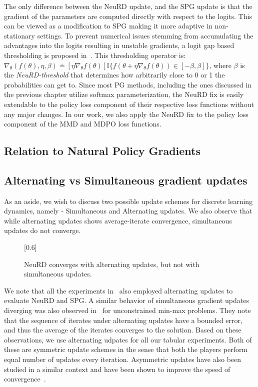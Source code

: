 The only difference between the NeuRD update, and the SPG update is that the gradient of the
parameters are computed directly with respect to the logits.
This can be viewed as a modification to SPG making it more adaptive in non-stationary settings.
To prevent numerical issues stemming from accumulating the advantages into the logits resulting in
unstable gradients, a logit gap based thresholding is proposed in~\cite{hennesNeural2020}.
This thresholding operator is: $\nabla_{\theta}(f(\theta), \eta, \beta) \doteq [\eta\nabla_\theta
		f(\theta)] \mathds{I}\{f(\theta + \eta\nabla_{\theta}f(\theta)) \in [-\beta, \beta]\}$, where
$\beta$ is the \textit{NeuRD-threshold} that determines how arbitrarily close to 0 or 1 the
probabilities can get to.
Since most PG methods, including the ones discussed in the previous chapter utilize softmax
parameterization, the NeuRD fix is easily extendable to the policy loss component of their
respective loss functions without any major changes.
In our work, we also apply the NeuRD fix to the policy loss component of the MMD and MDPO loss
functions.

\subsection{Relation to Natural Policy Gradients}

\subsection{Alternating vs Simultaneous gradient updates}
As an aside, we wish to discuss two possible update schemes for discrete learning dynamics, namely
- Simultaneous and Alternating updates.
We also observe that while alternating updates shows average-iterate convergence, simultaneous
updates do not converge.
\begin{figure}[H]
	\centering
	\scalebox{0.6}[0.6]{}
	\caption[Simultaneous gradient updates vs Alternate gradient updates updates]{NeuRD converges with alternating updates, but not with simultaneous updates.}
\end{figure}
We note that all the experiments in~\cite{hennesNeural2020} also employed alternating updates to
evaluate NeuRD and SPG.
A similar behavior of simultaneous gradient updates diverging was also observed
in~\cite{gidelVariational2020} for unconstrained min-max problems.
They note that the sequence of iterates under alternating updates have a bounded error, and thus
the average of the iterates converges to the solution.
Based on these observations, we use alternating udpates for all our tabular experiments.
Both of these are symmetric update schemes in the sense that both the players perform equal number
of updates every iteration.
Asymmetric updates have also been studied in a similar context and have been shown to improve the
speed of convergence~\cite{daskalakisTraining2018}.


